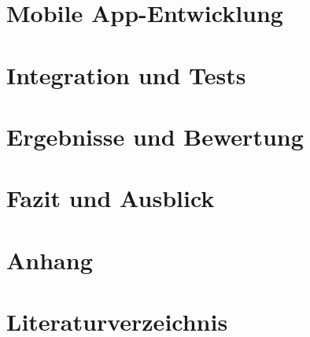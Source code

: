 \documentclass[a4paper, 10pt]{article} %
\begin{document}
\section{Mobile App-Entwicklung}
    

\section{Integration und Tests}
    

\section{Ergebnisse und Bewertung}


\section{Fazit und Ausblick}
    

\section{Anhang}
    

\section{Literaturverzeichnis}
% 
\printbibliography
\end{document}
